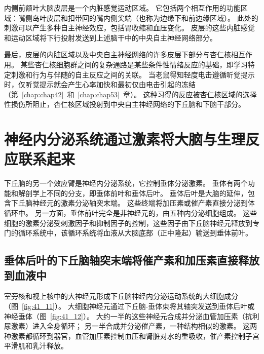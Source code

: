 内侧前额叶大脑皮层是一个内脏感觉运动区域。
它包括两个相互作用的功能区域：嘴侧岛叶皮层和扣带回的嘴内侧尖端（也称为边缘下和前边缘区域）。
此处的刺激可以产生多种自主神经效应，包括胃收缩和血压变化。
皮层的这些内脏感觉和运动区域将下行投射发送到上述脑干中的中央自主神经网络部分。


最后，皮层的内脏区域以及中央自主神经网络的许多皮层下部分与杏仁核相互作用。
某些杏仁核细胞群之间的复杂通路是某些条件性情绪反应的基础，即学习特定刺激和行为与伴随的自主反应之间的关联。
当老鼠得知轻度电击遵循听觉提示时，仅听觉提示就会产生心率加快和最初仅由电击引起的冻结（第~\ref{chap:chap42}~和~\ref{chap:chap53}~章）。
这种习得的反应被杏仁核区域的选择性损伤所阻止，杏仁核区域投射到中央自主神经网络的下丘脑和下脑干部分。



\section{神经内分泌系统通过激素将大脑与生理反应联系起来}

下丘脑的另一个效应臂是神经内分泌系统，它控制垂体分泌激素。
垂体有两个功能和解剖学上不同的分支，即垂体前叶和垂体后叶。
垂体后叶是大脑的延伸，包含下丘脑神经元的激素分泌轴突末端。
这些终端将加压素或催产素直接分泌到体循环中。
另一方面，垂体前叶完全是非神经元的，由五种内分泌细胞组成。
这些细胞的激素分泌受刺激因子和抑制因子的控制，这些因子由下丘脑神经元释放到专门的循环系统中，该循环系统将血液从大脑底部（正中隆起）输送到垂体前叶。



\subsection{垂体后叶的下丘脑轴突末端将催产素和加压素直接释放到血液中}

室旁核和视上核中的大神经元形成下丘脑神经内分泌运动系统的大细胞成分（图~\ref{fig:41_11}）。
大细胞神经元通过下丘脑-垂体束将其轴突发送到垂体后叶或神经垂体（图~\ref{fig:41_12}）。
大约一半的这些神经元合成并分泌血管加压素（抗利尿激素）进入全身循环；
另一半合成并分泌催产素，一种结构相似的激素。
这两种激素都循环到器官，血管加压素控制血压和肾脏对水的重吸收，催产素控制子宫平滑肌和乳汁释放。


